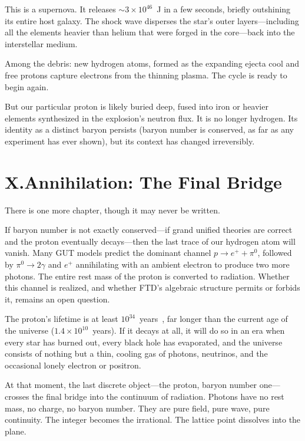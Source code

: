 \documentclass[11pt,a4paper]{article}
\begin{document}
This is a supernova.  It releases $\sim 3\times 10^{46}$~J in a few
seconds, briefly outshining its entire host galaxy.  The shock wave
disperses the star's outer layers---including all the elements heavier than
helium that were forged in the core---back into the interstellar medium.

Among the debris: new hydrogen atoms, formed as the expanding ejecta cool
and free protons capture electrons from the thinning plasma.  The cycle is
ready to begin again.

But our particular proton is likely buried deep, fused into iron or heavier
elements synthesized in the explosion's neutron flux.  It is no longer
hydrogen.  Its identity as a distinct baryon persists (baryon number is
conserved, as far as any experiment has ever shown), but its context has
changed irreversibly.

\section*{X.\quad Annihilation: The Final Bridge}

There is one more chapter, though it may never be written.

If baryon number is not exactly conserved---if grand unified theories are
correct and the proton eventually decays---then the last trace of our
hydrogen atom will vanish.  Many GUT models predict the dominant channel
$p\to e^+ + \pi^0$, followed by $\pi^0\to 2\gamma$ and $e^+$ annihilating
with an ambient electron to produce two more photons.  The entire rest mass
of the proton is converted to radiation.  Whether this channel is realized,
and whether FTD's algebraic structure permits or forbids it, remains an open
question.

The proton's lifetime is at least $10^{34}$~years~\cite{superK}, far longer
than the current age of the universe ($1.4\times 10^{10}$~years).  If it
decays at all, it will do so in an era when every star has burned out, every
black hole has evaporated, and the universe consists of nothing but a thin,
cooling gas of photons, neutrinos, and the occasional lonely electron or
positron.

At that moment, the last discrete object---the proton, baryon number
one---crosses the final bridge into the continuum of radiation.  Photons
have no rest mass, no charge, no baryon number.  They are pure field, pure
wave, pure continuity.  The integer becomes the irrational.  The lattice
point dissolves into the plane.
\end{document}
